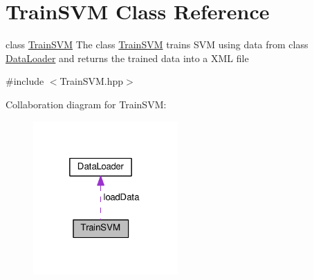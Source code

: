 \hypertarget{classTrainSVM}{}\section{Train\+S\+VM Class Reference}
\label{classTrainSVM}


class \hyperlink{classTrainSVM}{Train\+S\+VM} The class \hyperlink{classTrainSVM}{Train\+S\+VM} trains S\+VM using data from class \hyperlink{classDataLoader}{Data\+Loader} and returns the trained data into a X\+ML file  




{\ttfamily \#include $<$Train\+S\+V\+M.\+hpp$>$}



Collaboration diagram for Train\+S\+VM\+:
\nopagebreak
\begin{figure}[H]
\begin{center}
\leavevmode
\includegraphics[width=157pt]{classTrainSVM__coll__graph}
\end{center}
\end{figure}
